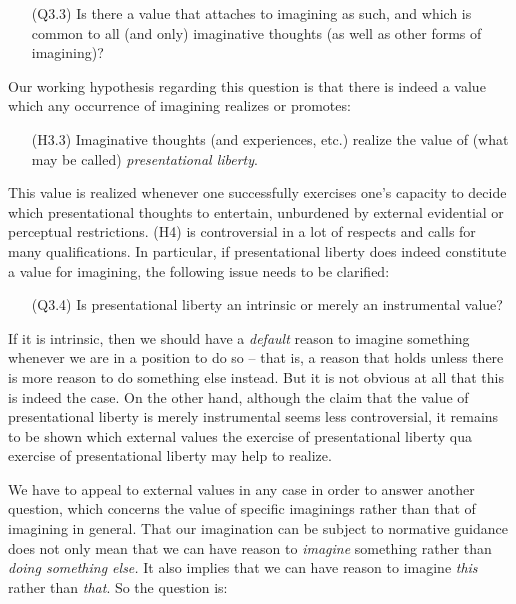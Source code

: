 \vspace{-.1cm}
\begin{itemize}[leftmargin=2cm]
\item[(Q3.3)] Is there a value that attaches to imagining as such, and which is common to all (and only) imaginative thoughts (as well as other forms of imagining)?
\end{itemize}
\vspace{-.1cm}

\noindent Our working hypothesis regarding this question is that there is indeed a value which any occurrence of imagining realizes or promotes:

\vspace{-.1cm}
\begin{itemize}[leftmargin=2cm]
\item[(H3.3)] Imaginative thoughts (and experiences, etc.) realize the value of (what may be called) \emph{presentational liberty}.
\end{itemize}
\vspace{-.1cm}

\noindent This value is realized whenever one successfully exercises one's capacity to decide which presentational thoughts to entertain, unburdened by external evidential or perceptual restrictions. (H4) is controversial in a lot of respects and calls for many qualifications. In particular, if presentational liberty does indeed constitute a value for imagining, the following issue needs to be clarified:

\vspace{-.1cm}
\begin{itemize}[leftmargin=2cm]
\item[(Q3.4)] Is presentational liberty an intrinsic or merely an instrumental value?
\end{itemize}
\vspace{-.1cm}

\noindent If it is intrinsic, then we should have a \emph{default} reason to imagine something whenever we are in a position to do so -- that is, a reason that holds unless there is more reason to do something else instead. But it is not obvious at all that this is indeed the case. On the other hand, although the claim that the value of presentational liberty is merely instrumental seems less controversial, it remains to be shown which external values the exercise of presentational liberty qua exercise of presentational liberty may help to realize.

We have to appeal to external values in any case in order to answer another question, which concerns the value of specific imaginings rather than that of imagining in general. That our imagination can be subject to normative guidance does not only mean that we can have reason to \emph{imagine} something rather than \emph{doing something else.} It also implies that we can have reason to imagine \emph{this} rather than \emph{that}. So the question is:

